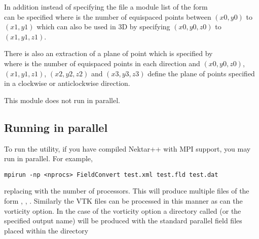 In addition instead of specifying the file  a module list of
the form \\
can be specified where  is the number of equispaced points between
$(x0,y0)$ to $(x1,y1)$ which can also be used in 3D by specifying $(x0,y0,z0)$
to $(x1,y1,z1)$.

There is also an extraction of a plane of point which is specified by \\
where  is the number of equispaced points in each direction 
and $(x0,y0,z0)$, $(x1,y1,z1)$, $(x2,y2,z2)$ and $(x3,y3,z3)$ define the plane
of points specified in a clockwise or anticlockwise direction.

\begin{notebox}
This module does not run in parallel.
\end{notebox}


\subsection{Running in parallel}
To run the utility, if you have compiled Nektar++ with MPI support, you may run
in parallel. For example,
\begin{lstlisting}[style=BashInputStyle]
mpirun -np <nprocs> FieldConvert test.xml test.fld test.dat
\end{lstlisting}
replacing  with the number of processors. This will produce 
multiple  files of the form , 
, . Similarly the VTK files can be
processed in this manner as can the vorticity option. In the case of the 
vorticity option a directory called  (or the specified 
output name) will be produced with the standard parallel field files placed 
within the directory



